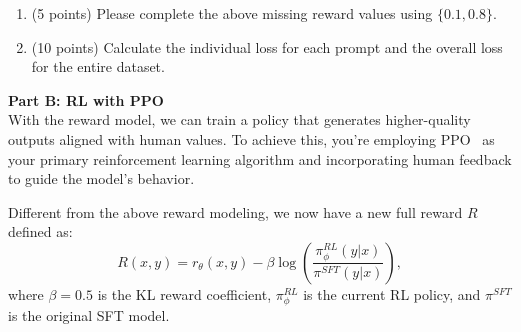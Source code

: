 \begin{enumerate}
\item (5 points)
Please complete the above missing reward values using $\{0.1, 0.8\}$.


\item (10 points) 
Calculate the individual loss for each prompt and the overall loss for the entire dataset.





\end{enumerate}


\noindent\textbf{Part B: RL with PPO}\\
With the reward model, we can train a policy that generates higher-quality outputs aligned with human values. To achieve this, you're employing PPO~\cite{schulman2017proximal} as your primary reinforcement learning algorithm and incorporating human feedback to guide the model's behavior. 

Different from the above reward modeling, we now have a new full reward $R$ defined as:
\begin{equation}
R(x, y) = r_\theta(x, y) - \beta \log\left( \frac{\pi^{RL}_\phi(y|x)}{\pi^{SFT}(y|x)} \right),
\end{equation}
where $\beta=0.5$ is the KL reward coefficient,  $\pi_{\phi}^{RL}$ is the current RL policy, and  $\pi^{SFT}$ is the original SFT model.

